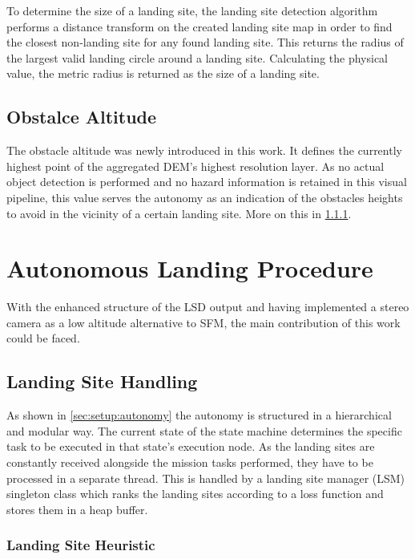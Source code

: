 To determine the size of a landing site, the landing site detection algorithm performs a distance transform on the created landing site map in order to find the closest non-landing site for any found landing site. This returns the radius of the largest valid landing circle around a landing site. Calculating the physical value, the metric radius is returned as the size of a landing site.

\subsection{Obstalce Altitude}

The obstacle altitude was newly introduced in this work. It defines the currently highest point of the aggregated DEM's highest resolution layer. As no actual object detection is performed and no hazard information is retained in this visual pipeline, this value serves the autonomy as an indication of the obstacles heights to avoid in the vicinity of a certain landing site. More on this in \cref{subsubsec:LandingSiteHeuristic}.



\section{Autonomous Landing Procedure}

With the enhanced structure of the LSD output and having implemented a stereo camera as a low altitude alternative to SFM, the main contribution of this work could be faced.

\subsection{Landing Site Handling}

As shown in \cref{sec:setup:autonomy} the autonomy is structured in a hierarchical and modular way. The current state of the state machine determines the specific task to be executed in that state's execution node. As the landing sites are constantly received alongside the mission tasks performed, they have to be processed in a separate thread. This is handled by a landing site manager (LSM) singleton class which ranks the landing sites according to a loss function and stores them in a heap buffer.

\subsubsection{Landing Site Heuristic}\label{subsubsec:LandingSiteHeuristic}

